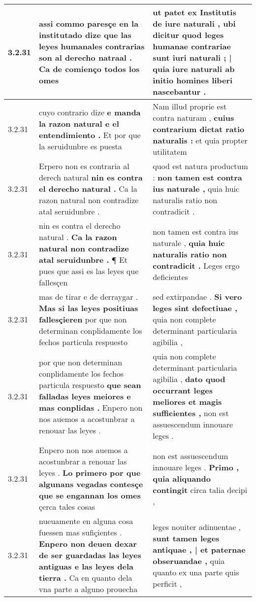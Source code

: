 \begin{tabular}{|p{1cm}|p{6.5cm}|p{6.5cm}|}
3.2.31 & assi commo paresçe en la \textbf{ institutado dize que las leyes humanales contrarias son al derecho natraal . } Ca de comienço todos los omes & ut patet ex Institutis de iure naturali , \textbf{ ubi dicitur quod leges humanae contrariae sunt iuri naturali ; | quia iure naturali } ab initio homines liberi nascebantur . \\\hline
3.2.31 & cuyo contrario dize \textbf{ e manda la razon natural e el entendimiento . } Et por que la seruidunbre es puesta & Nam illud proprie est contra naturam , \textbf{ cuius contrarium dictat ratio naturalis : } et quia propter utilitatem \\\hline
3.2.31 & Erpero non es contraria al derech natural \textbf{ nin es contra el derecho natural . } Ca la razon natural non contradize atal seruidunbre . & quod est natura productum : \textbf{ non tamen est contra ius naturale , } quia huic naturalis ratio non contradicit . \\\hline
3.2.31 & nin es contra el derecho natural . \textbf{ Ca la razon natural non contradize atal seruidunbre . } ¶ Et pues que assi es las leyes que fallesçen & non tamen est contra ius naturale , \textbf{ quia huic naturalis ratio non contradicit . } Leges ergo deficientes \\\hline
3.2.31 & mas de tirar e de derraygar . \textbf{ Mas si las leyes positiuas fallesçieren } por que non determinan conplidamente los fechos particula respuesto & sed extirpandae . \textbf{ Si vero leges sint defectiuae , } quia non complete determinant particularia agibilia , \\\hline
3.2.31 & por que non determinan conplidamente los fechos particula respuesto \textbf{ que sean falladas leyes meiores e mas conplidas . } Enpero non nos auemos a acostunbrar a renouar las leyes . & quia non complete determinant particularia agibilia , \textbf{ dato quod occurrant leges meliores et magis sufficientes , } non est assuescendum innouare leges . \\\hline
3.2.31 & Enpero non nos auemos a acostunbrar a renouar las leyes . \textbf{ Lo primero por que algunans vegadas contesçe que se engannan los omes } çerca tales cosas & non est assuescendum innouare leges . \textbf{ Primo , quia aliquando contingit } circa talia decipi , \\\hline
3.2.31 & nueuamente en alguna cosa fuessen mas sufiçientes . \textbf{ Enpero non deuen dexar de ser guardadas las leyes antiguas e las leyes dela tierra . } Ca en quanto dela vna parte a alguno prouecha & leges nouiter adinuentae , \textbf{ sunt tamen leges antiquae , | et paternae obseruandae , } quia quanto ex una parte quis perficit , \\\hline

\end{tabular}
